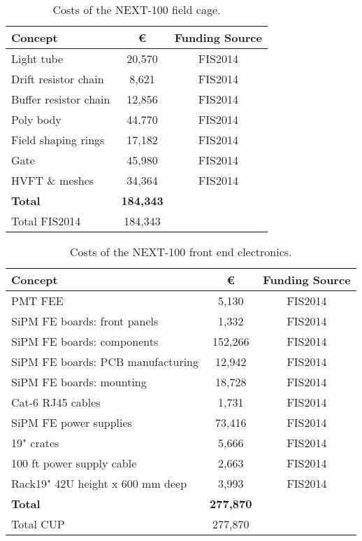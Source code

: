 \begin{table}[h!]
\begin{center}
\begin{tabular}{|l|c|c|}
\hline
 Concept & \euro & Funding Source \\
 \hline
 Light tube & 20,570 & FIS2014 \\
 Drift resistor chain & 8,621 & FIS2014 \\
 Buffer resistor chain & 12,856 & FIS2014\\
 Poly body & 44,770 & FIS2014 \\
 Field shaping rings & 17,182 & FIS2014 \\
 Gate &45,980 & FIS2014 \\
 HVFT \& meshes & 34,364 & FIS2014 \\
  \hline
{\bf Total} &	{\bf 184,343}	& \\
  Total FIS2014	&	184,343	& \\
 \hline\hline
\end{tabular}  
\caption{Costs of the NEXT-100 field cage.}
\label{tab.n100:FC}
\end{center}
\end{table} 

\begin{table}[h!]
\begin{center}
\begin{tabular}{|l|c|c|}
\hline
 Concept & \euro & Funding Source \\
 \hline
 PMT FEE & 5,130 & FIS2014 \\
 SiPM FE boards: front panels	& 1,332 & FIS2014 \\
SiPM FE boards: components	&	152,266 & FIS2014 \\
SiPM FE boards: PCB manufacturing	&	12,942  & FIS2014 \\
SiPM FE boards:  mounting	&	18,728 & FIS2014 \\
Cat-6 RJ45 cables &	1,731 & FIS2014 \\
SiPM FE power supplies & 73,416 & FIS2014 \\
19" crates  &	5,666 & FIS2014 \\
100 ft power supply cable &	2,663 & FIS2014 \\
Rack19" 42U height x 600 mm deep &	3,993 & FIS2014 \\

  \hline
{\bf Total}	&	{\bf 277,870}	& \\
 Total CUP	&	277,870	& \\
 \hline\hline
\end{tabular}  
\caption{Costs of the NEXT-100 front end electronics.}
\label{tab.n100:FEE}
\end{center}
\end{table} 

